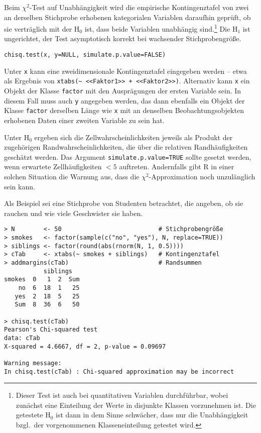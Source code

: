 Beim $\chi^{2}$-Test auf Unabhängigkeit wird die empirische Kontingenztafel von zwei an derselben Stichprobe erhobenen kategorialen Variablen daraufhin geprüft, ob sie verträglich mit der $\text{H}_{0}$ ist, dass beide Variablen unabhängig sind.\footnote{Dieser Test ist auch bei quantitativen Variablen durchführbar, wobei zunächst eine Einteilung der Werte in disjunkte Klassen vorzunehmen ist. Die getestete $\text{H}_{0}$ ist dann in dem Sinne schwächer, dass nur die Unabhängigkeit bzgl.\ der vorgenommenen Klasseneinteilung getestet wird.} Die $\text{H}_{1}$ ist ungerichtet, der Test asymptotisch korrekt bei wachsender Stichprobengröße.
\begin{lstlisting}
chisq.test(x, y=NULL, simulate.p.value=FALSE)
\end{lstlisting}

Unter \lstinline!x! kann eine zweidimensionale Kontingenztafel eingegeben werden -- etwa als Ergebnis von \lstinline!xtabs(~ <<Faktor1>> + <<Faktor2>>)!. Alternativ kann \lstinline!x! ein Objekt der Klasse \lstinline!factor! mit den Ausprägungen der ersten Variable sein. In diesem Fall muss auch \lstinline!y! angegeben werden, das dann ebenfalls ein Objekt der Klasse \lstinline!factor! derselben Länge wie \lstinline!x! mit an denselben Beobachtungsobjekten erhobenen Daten einer zweiten Variable zu sein hat.

Unter $\text{H}_{0}$ ergeben sich die Zellwahrscheinlichkeiten jeweils als Produkt der zugehörigen Randwahrscheinlichkeiten, die über die relativen Randhäufigkeiten geschätzt werden. Das Argument \lstinline!simulate.p.value=TRUE! sollte gesetzt werden, wenn erwartete Zellhäufigkeiten $< 5$ auftreten. Andernfalls gibt R in einer solchen Situation die Warnung aus, dass die $\chi^{2}$-Approximation noch unzulänglich sein kann.

Als Beispiel sei eine Stichprobe von Studenten betrachtet, die angeben, ob sie rauchen und wie viele Geschwister sie haben.
\begin{lstlisting}
> N        <- 50                           # Stichprobengröße
> smokes   <- factor(sample(c("no", "yes"), N, replace=TRUE))
> siblings <- factor(round(abs(rnorm(N, 1, 0.5))))
> cTab     <- xtabs(~ smokes + siblings)   # Kontingenztafel
> addmargins(cTab)                         # Randsummen
           siblings
smokes  0   1  2  Sum
    no  6  18  1   25
   yes  2  18  5   25
   Sum  8  36  6   50

> chisq.test(cTab)
Pearson's Chi-squared test
data: cTab
X-squared = 4.6667, df = 2, p-value = 0.09697

Warning message:
In chisq.test(cTab) : Chi-squared approximation may be incorrect
\end{lstlisting}

